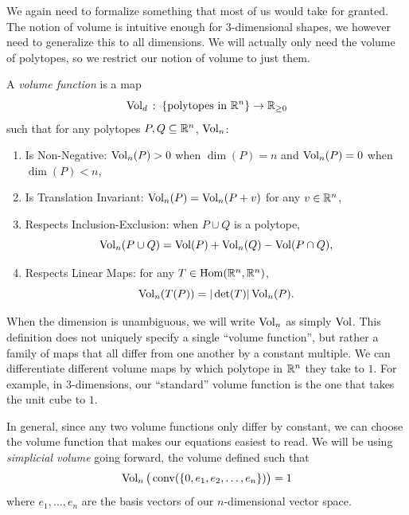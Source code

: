 \documentclass[12pt,oneside]{../../sfsuthesis}
\begin{document}
We again need to formalize something that most of us would take for granted.
The notion of volume is intuitive enough for 3-dimensional shapes, we however need to generalize this to all dimensions.
We will actually only need the volume of polytopes, so we restrict our notion of volume to just them.
\begin{definition}
    A \emph{volume function} is a map
    \[
        \operatorname{Vol}_d\,:\; \{\text{polytopes in \( \mathbb{R}^n \)}\} \to \mathbb{R}_{\geq 0}
    \]
    such that for any polytopes \( P,Q \subseteq \mathbb{R}^n \), \( \operatorname{Vol}_n \):
    \begin{enumerate}
        \item{Is Non-Negative:} \( \operatorname{Vol}_n(P) > 0 \) when \( \dim(P) = n \) and \( \operatorname{Vol}_n(P) = 0 \) when \( \dim(P) < n \),
        \item{Is Translation Invariant:} \( \operatorname{Vol}_n(P) =  \operatorname{Vol}_n(P+v) \) for any \( v \in \mathbb{R}^n \),
        \item{Respects Inclusion-Exclusion:} when \( P \cup Q \) is a polytope,
        \[
            \operatorname{Vol}_n(P \cup Q) = \operatorname{Vol}(P) + \operatorname{Vol}_n(Q) - \operatorname{Vol}(P \cap Q),
        \]
        \item{Respects Linear Maps:} for any \( T \in \operatorname{Hom}(\mathbb{R}^n, \mathbb{R}^n) \),
        \[
            \operatorname{Vol}_n(T(P)) = |\det(T)|\operatorname{Vol}_n(P).
        \]
    \end{enumerate}
\end{definition}
When the dimension is unambiguous, we will write \( \operatorname{Vol}_n \) as simply \( \operatorname{Vol} \).
This definition does not uniquely specify a single ``volume function'', but rather a family of maps that all differ from one another by a constant multiple.
We can differentiate different volume maps by which polytope in \( \mathbb{R}^n \) they take to \( 1 \).
For example, in \( 3 \)-dimensions, our ``standard'' volume function is the one that takes the unit cube to \( 1 \).

In general, since any two volume functions only differ by constant, we can choose the volume function that makes our equations easiest to read.
We will be using \textit{simplicial volume} going forward, the volume defined such that
\[
    \operatorname{Vol}_n \big(\operatorname{conv}(\{0, e_1, e_2, \dots, e_n\})\big) = 1
\]
where \( e_1, \dots, e_n \) are the basis vectors of our \( n \)-dimensional vector space.
\end{document}

